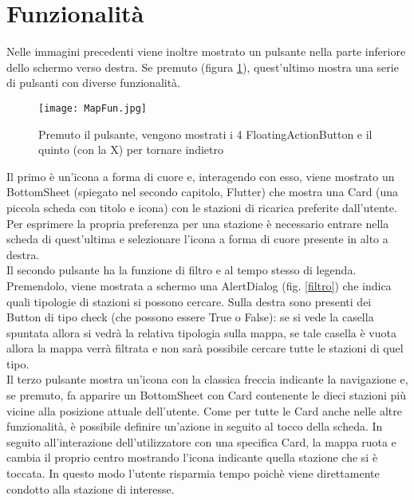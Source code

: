 \section{Funzionalità}
Nelle immagini precedenti viene inoltre mostrato un pulsante nella parte inferiore
dello schermo verso destra. Se premuto (figura \ref{4puls}), quest'ultimo mostra una serie di
pulsanti con diverse funzionalità.
\begin{figure}[!h]
    \centering
    \texttt{[image: MapFun.jpg]}
    \caption{Premuto il pulsante, vengono mostrati i 4 FloatingActionButton e il quinto (con la X) per tornare indietro}
    \label{4puls}
\end{figure}
Il primo è un'icona a forma di cuore e,
interagendo con esso, viene mostrato un BottomSheet (spiegato nel secondo
capitolo, Flutter) che mostra una Card (una piccola scheda con titolo e icona)
con le stazioni di ricarica preferite dall'utente. Per esprimere la propria
preferenza per una stazione è necessario entrare nella scheda di quest'ultima e
selezionare l'icona a forma di cuore presente in alto a destra. \\
Il secondo pulsante ha la funzione di filtro e al tempo stesso di legenda.
Premendolo, viene mostrata a schermo una AlertDialog (fig. \ref{filtro}) che indica quali
tipologie di stazioni si possono cercare. Sulla destra sono presenti dei Button
di tipo check (che possono essere True o False): se si vede la casella spuntata
allora si vedrà la relativa tipologia sulla mappa, se tale casella è vuota
allora la mappa verrà filtrata e non sarà possibile cercare tutte le stazioni di
quel tipo. \\
Il terzo pulsante mostra un'icona con la classica freccia indicante la
navigazione e, se premuto, fa apparire un BottomSheet con Card contenente le
dieci stazioni più vicine alla posizione attuale dell'utente. Come per tutte le
Card anche nelle altre funzionalità, è possibile definire un'azione in seguito
al tocco della scheda. In seguito all'interazione dell'utilizzatore con una
specifica Card, la mappa ruota e cambia il proprio centro mostrando l'icona
indicante quella stazione che si è toccata. In questo modo l'utente risparmia
tempo poichè viene direttamente condotto alla stazione di interesse.
